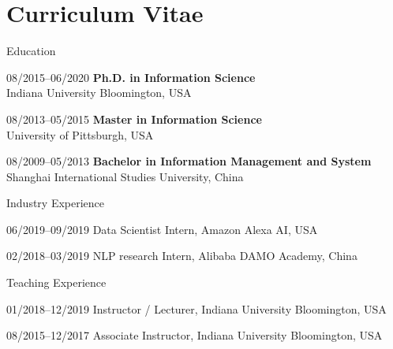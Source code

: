 \chapter*{Curriculum Vitae}
\begin{spacing}{1.0}


\begin{cv}{}
	\begin{cvlist}{Education}
		\item[08/2015--06/2020] \textbf{Ph.D. in Information Science} \\ Indiana University Bloomington, USA
		\item[08/2013--05/2015] \textbf{Master in Information Science}\\ University of Pittsburgh, USA
		\item[08/2009--05/2013] \textbf{Bachelor in Information Management and System} \\ Shanghai International Studies University, China
	\end{cvlist}

	\begin{cvlist}{Industry Experience}
	\item[06/2019--09/2019] Data Scientist Intern, Amazon Alexa AI, USA 
	\item[02/2018--03/2019] NLP research Intern, Alibaba DAMO Academy, China
	\end{cvlist}

	\begin{cvlist}{Teaching Experience}
		\item[01/2018--12/2019] Instructor / Lecturer, Indiana University Bloomington, USA
	\item[08/2015--12/2017] Associate Instructor, Indiana University Bloomington, USA
	\end{cvlist}
	

\end{cv}
\end{spacing}
